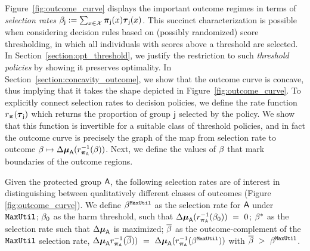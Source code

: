 Figure~\ref{fig:outcome_curve} displays the important outcome regimes in terms of \emph{selection rates} $\beta_{\mathsf{j}} := \sum_{x \in \mathcal{X}} \boldsymbol{\pi}_{\mathsf{j}}(x)\boldsymbol{\tau}_{\mathsf{j}}(x)$. This succinct characterization is possible when considering decision rules based on (possibly randomized) score thresholding, in which all individuals with scores above a threshold are selected. In Section~\ref{section:opt_threshold}, we justify the restriction to such \emph{threshold policies} by showing it preserves optimality. In Section~\ref{section:concavity_outcome}, we show that the outcome curve is concave, thus implying that it takes the shape depicted in Figure~\ref{fig:outcome_curve}. To explicitly connect selection rates to decision policies, we define the rate function $r_{\boldsymbol{\pi}}(\boldsymbol{\tau}_{\mathsf{j}})$ which returns the proportion of group $\mathsf{j}$ selected by the policy. We show that this function is invertible for a suitable class of threshold policies, and in fact the outcome curve is precisely the graph of the map from selection rate to outcome $\beta \mapsto \Delta\boldsymbol{\mu}_{\mathsf{A}} (r_{\boldsymbol{\pi}_{\mathsf{A}}}^{-1}(\beta))$. Next, we define the values of $\beta$ that mark boundaries of the outcome regions.

\begin{defn}\label{def:special_betas}
	Given the protected group $\mathsf{A}$, the following selection rates are of interest in distinguishing between qualitatively different classes of outcomes (Figure \ref{fig:outcome_curve}). We define $\beta^{\mathtt{MaxUtil}}$ as the selection rate for $\mathsf{A}$ under $\mathtt{MaxUtil}$; $\beta_0$ as the harm threshold, such that $\Delta\boldsymbol{\mu}_{\mathsf{A}}(r^{-1}_{\boldsymbol{\pi}_{\mathsf{A}}}(\beta_0))~=~0$; $\beta^*$ as the selection rate such that $\Delta\boldsymbol{\mu}_{\mathsf{A}}$ is maximized; $\overline{\beta}$ as the outcome-complement of the $\mathtt{MaxUtil}$ selection rate, $\Delta\boldsymbol{\mu}_{\mathsf{A}} r_{\boldsymbol{\pi}_{\mathsf{A}}}^{-1}(\overline{\beta}))~=~\Delta\boldsymbol{\mu}_{\mathsf{A}} (r_{\boldsymbol{\pi}_{\mathsf{A}}}^{-1}(\beta^{\mathtt{MaxUtil}}))$ with $\overline{\beta}~>~\beta^{\mathtt{MaxUtil}}$.
\end{defn}



